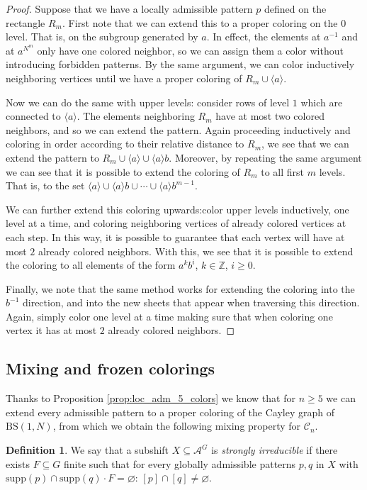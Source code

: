 \documentclass[letterpaper,11pt,reqno]{amsart}
\theoremstyle{plain}
\theoremstyle{definition}
\newtheorem{definition}{Definition}[section]
\theoremstyle{cupremark}
\newcommand{\BS}[1][N]{\mathrm{BS}(1,#1)}
\begin{document}
\begin{proof}
	Suppose that we have a locally admissible pattern $p$ defined on the rectangle $R_{m}$. First note that we can extend this to a proper coloring on the $0$ level. That is, on the subgroup generated by $a$. In effect, the elements at $a^{-1}$ and at $a^{N^m}$ only have one colored neighbor, so we can assign them a color without introducing forbidden patterns. By the same argument, we can color inductively neighboring vertices until we have a proper coloring of $R_m\cup \langle a \rangle$.
	
	Now we can do the same with upper levels: consider rows of level $1$ which are connected to $\langle a\rangle$. The elements neighboring $R_m$ have at most two colored neighbors, and so we can extend the pattern. Again proceeding inductively and coloring in order according to their relative distance to $R_m$, we see that we can extend the pattern to $R_m\cup \langle a\rangle \cup \langle a\rangle b$. Moreover, by repeating the same argument we can see that it is possible to extend the coloring of $R_m$ to all first $m$ levels. That is, to the set $\langle a\rangle \cup \langle a\rangle b \cup \cdots \cup \langle a\rangle b^{m-1} .$
	
	We can further extend this coloring upwards:color upper levels inductively, one level at a time, and coloring neighboring vertices of already colored vertices at each step. In this way, it is possible to guarantee that each vertex will have at most $2$ already colored neighbors. With this, we see that it is possible to extend the coloring to all elements of the form $a^kb^i$, $k\in \mathbb{Z}$, $i\ge 0$.
	
	Finally, we note that the same method works for extending the coloring into the $b^{-1}$ direction, and into the new sheets that appear when traversing this direction. Again, simply color one level at a time making sure that when coloring one vertex it has at most $2$ already colored neighbors.
\end{proof}


\subsection{Mixing and frozen colorings}\label{subsection:mixing_and frozen}
Thanks to Proposition \ref{prop:loc_adm_5_colors} we know that for $n\ge 5$ we can extend every admissible pattern to a proper coloring of the Cayley graph of $\BS$, from which we obtain the following mixing property for $\mathcal{C}_n$.
\begin{definition} We say that a subshift $X\subseteq \mathcal{A}^G$ is \textit{strongly irreducible} if there exists $F\subseteq G$ finite such that for every globally admissible patterns $p,q$ in $X$ with $\mathrm{supp}(p)\cap \mathrm{supp}(q)\cdot F=\varnothing$: $[p]\cap [q]\neq \varnothing$.
\end{definition}
\end{document}
